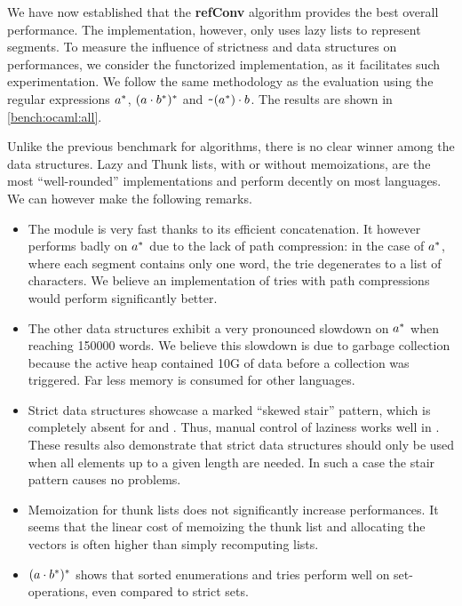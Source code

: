 We have now established that the \textbf{refConv} algorithm
provides the best overall performance.  The \haskell implementation,
however, only uses lazy lists to represent segments.
To measure the influence of strictness and data structures on
performances, we consider the functorized \ocaml implementation, as it facilitates such experimentation.
We follow the same methodology as the \haskell evaluation using the
regular expressions $a^*$, $(a \cdot{b^*})^*$ and
$\texttt{\textasciitilde}{(a^*)} \cdot{b}$.  The results are shown in
\cref{bench:ocaml:all}.

Unlike the previous benchmark for algorithms, there is no clear winner
among the data structures.
Lazy and Thunk lists, with or without memoizations, are the most ``well-rounded''
implementations and perform decently on most languages.
We can however make the following remarks.
\begin{itemize}[leftmargin=*]
\item The  module
  is very fast thanks to its efficient concatenation.
  It however performs badly on $a^*$
  due to the lack of path compression:
  in the case of $a^*$, where each segment contains only one word, the
  trie degenerates to a list of characters.
  We believe an implementation of tries with path compressions would perform
  significantly better.
\item The other data structures exhibit a very pronounced slowdown on $a^*$
  when reaching 150000 words.
  We believe this slowdown is due to garbage collection because
  the active heap contained 10G of data before
  a collection was triggered. Far less memory is consumed for other languages.
\item Strict data structures showcase a marked ``skewed
  stair'' pattern, which is completely absent for  and
  . Thus, manual control of laziness works well in
  \ocaml. These results also demonstrate that strict data structures
  should only be used when all elements up to a given length are
  needed. In such a case the stair pattern causes no problems.
\item Memoization for thunk lists does not significantly increase performances.
  It seems that the linear cost of memoizing the thunk list and
  allocating the vectors
  is often higher than simply recomputing lists.
\item $(a \cdot{b^*})^*$ shows that sorted enumerations and tries
  perform well on set-operations, even compared to strict sets.
\end{itemize}

